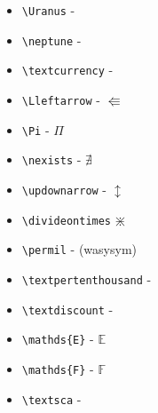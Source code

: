 \begin{multicols}{2}
\begin{itemize}
\begin{itemize}
        \item \verb+\Uranus+ - \Uranus
        \item \verb+\neptune+ - %
        \item \verb+\textcurrency+ - \textcurrency
        \item \verb+\Lleftarrow+ - $\Lleftarrow$
        \item \verb+\Pi+ - $\Pi$
        \item \verb+\nexists+ - $\nexists$
        \item \verb+\updownarrow+ - $\updownarrow$
        \item \verb+\divideontimes+ $\divideontimes$
        \item \verb+\permil+ - (wasysym)
        \item \verb+\textpertenthousand+ - \textpertenthousand
        \item \verb+\textdiscount+ - \textdiscount
        \item \verb+\mathds{E}+ - $\mathds{E}$
        \item \verb+\mathds{F}+ - $\mathds{F}$
        \item \verb+\textsca+ - %
    \end{itemize}
\end{itemize}
\end{multicols}